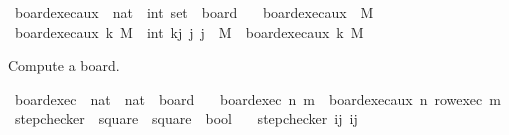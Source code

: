 \begin{isabellebody}
\isanewline
{}\isamarkupfalse%
\ board{\isacharunderscore}{\kern0pt}exec{\isacharunderscore}{\kern0pt}aux\ {\isacharcolon}{\kern0pt}{\isacharcolon}{\kern0pt}\ {\isachardoublequoteopen}nat\ {\isasymRightarrow}\ int\ set\ {\isasymRightarrow}\ board{\isachardoublequoteclose}\ \isanewline
\ \ {\isachardoublequoteopen}board{\isacharunderscore}{\kern0pt}exec{\isacharunderscore}{\kern0pt}aux\ {}\ M\ {\isacharequal}{\kern0pt}\ {\isacharbraceleft}{\kern0pt}{\isacharbraceright}{\kern0pt}{\isachardoublequoteclose}\ \ \isanewline
{\isacharbar}{\kern0pt}\ {\isachardoublequoteopen}board{\isacharunderscore}{\kern0pt}exec{\isacharunderscore}{\kern0pt}aux\ k\ M\ {\isacharequal}{\kern0pt}\ {\isacharbraceleft}{\kern0pt}{\isacharparenleft}{\kern0pt}int\ k{\isacharcomma}{\kern0pt}j{\isacharparenright}{\kern0pt}\ {\isacharbar}{\kern0pt}j{\isachardot}{\kern0pt}\ j\ {\isasymin}\ M{\isacharbraceright}{\kern0pt}\ {\isasymunion}\ board{\isacharunderscore}{\kern0pt}exec{\isacharunderscore}{\kern0pt}aux\ {\isacharparenleft}{\kern0pt}k{\isacharminus}{\kern0pt}{}{\isacharparenright}{\kern0pt}\ M{\isachardoublequoteclose}%
\begin{isamarkuptext}%
Compute a board.%
\end{isamarkuptext}\isamarkuptrue%
\isamarkupfalse%
\ board{\isacharunderscore}{\kern0pt}exec\ {\isacharcolon}{\kern0pt}{\isacharcolon}{\kern0pt}\ {\isachardoublequoteopen}nat\ {\isasymRightarrow}\ nat\ {\isasymRightarrow}\ board{\isachardoublequoteclose}\ \isanewline
\ \ {\isachardoublequoteopen}board{\isacharunderscore}{\kern0pt}exec\ n\ m\ {\isacharequal}{\kern0pt}\ board{\isacharunderscore}{\kern0pt}exec{\isacharunderscore}{\kern0pt}aux\ n\ {\isacharparenleft}{\kern0pt}row{\isacharunderscore}{\kern0pt}exec\ m{\isacharparenright}{\kern0pt}{\isachardoublequoteclose}\isanewline
\isanewline
{}\isamarkupfalse%
\ step{\isacharunderscore}{\kern0pt}checker\ {\isacharcolon}{\kern0pt}{\isacharcolon}{\kern0pt}\ {\isachardoublequoteopen}square\ {\isasymRightarrow}\ square\ {\isasymRightarrow}\ bool{\isachardoublequoteclose}\ \isanewline
\ \ {\isachardoublequoteopen}step{\isacharunderscore}{\kern0pt}checker\ {\isacharparenleft}{\kern0pt}i{\isacharcomma}{\kern0pt}j{\isacharparenright}{\kern0pt}\ {\isacharparenleft}{\kern0pt}i{\isacharprime}{\kern0pt}{\isacharcomma}{\kern0pt}j{\isacharprime}{\kern0pt}{\isacharparenright}{\kern0pt}\ {\isacharequal}{\kern0pt}\ \isanewline

\end{isabellebody}
